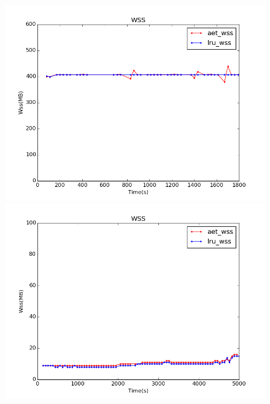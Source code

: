 \documentclass[10pt,twocolumn]{article}
\begin{document}
\begin{figure}[!htbp]
{\begin{minipage}[b]{0.1\textwidth}
			\includegraphics[width=1\textwidth]{img/aet_lru_cmp_cactus.png} \\
			\includegraphics[width=1\textwidth]{img/aet_lru_cmp_sphinx3.png} 
		\end{minipage}
	}
\end{figure}
\end{document}
